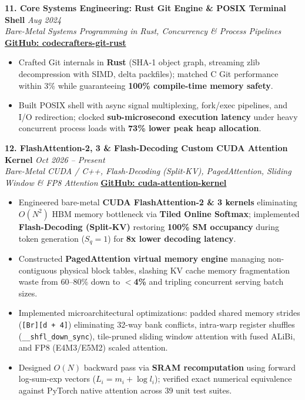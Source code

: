 \documentclass[9.5pt,a4paper]{article}
\begin{document}
\vspace{2.0pt}
\noindent\textbf{11. Core Systems Engineering: Rust Git Engine \& POSIX Terminal Shell} \hfill {\small\textit{Aug 2024}}\\
\textit{Bare-Metal Systems Programming in Rust, Concurrency \& Process Pipelines} \hfill {\footnotesize\href{https://github.com/KishorKumarParoi/codecrafters-git-rust}{\textbf{GitHub: codecrafters-git-rust}}}
\begin{itemize}
    \item Crafted Git internals in \textbf{Rust} (SHA-1 object graph, streaming zlib decompression with SIMD, delta packfiles); matched C Git performance within 3\% while guaranteeing \textbf{100\% compile-time memory safety}.
    \item Built POSIX shell with async signal multiplexing, fork/exec pipelines, and I/O redirection; clocked \textbf{sub-microsecond execution latency} under heavy concurrent process loads with \textbf{73\% lower peak heap allocation}.
\end{itemize}

\vspace{2.0pt}
\noindent\textbf{12. FlashAttention-2, 3 \& Flash-Decoding Custom CUDA Attention Kernel} \hfill {\small\textit{Oct 2026 -- Present}}\\
\textit{Bare-Metal CUDA / C++, Flash-Decoding (Split-KV), PagedAttention, Sliding Window \& FP8 Attention} \hfill {\footnotesize\href{https://github.com/KishorKumarParoi/cuda-attention-kernel}{\textbf{GitHub: cuda-attention-kernel}}}
\begin{itemize}
    \item Engineered bare-metal \textbf{CUDA FlashAttention-2 \& 3 kernels} eliminating $O(N^2)$ HBM memory bottleneck via \textbf{Tiled Online Softmax}; implemented \textbf{Flash-Decoding (Split-KV)} restoring \textbf{100\% SM occupancy} during token generation ($S_q = 1$) for \textbf{8x lower decoding latency}.
    \item Constructed \textbf{PagedAttention virtual memory engine} managing non-contiguous physical block tables, slashing KV cache memory fragmentation waste from 60--80\% down to \textbf{$<$4\%} and tripling concurrent serving batch sizes.
    \item Implemented microarchitectural optimizations: padded shared memory strides (\texttt{[Br][d + 4]}) eliminating 32-way bank conflicts, intra-warp register shuffles (\texttt{\_\_shfl\_down\_sync}), tile-pruned sliding window attention with fused ALiBi, and FP8 (E4M3/E5M2) scaled attention.
    \item Designed $O(N)$ backward pass via \textbf{SRAM recomputation} using forward log-sum-exp vectors ($L_i = m_i + \log l_i$); verified exact numerical equivalence against PyTorch native attention across 39 unit test suites.
\end{itemize}
\end{document}
